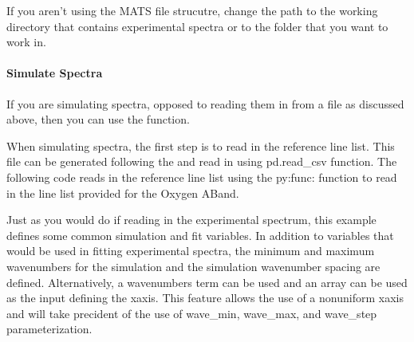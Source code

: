 \documentclass[letterpaper,10pt,english]{sphinxmanual}
\begin{document}
\sphinxAtStartPar
If you aren’t using the MATS file strucutre, change the path to the working directory that contains experimental spectra or to the folder that you want to work in.

\begin{sphinxVerbatim}[commandchars=\\\{\}]
\end{sphinxVerbatim}


\paragraph{Simulate Spectra}
\label{\detokenize{Fitting Synthetic Spectra:simulate-spectra}}
\sphinxAtStartPar
If you are simulating spectra, opposed to reading them in from a file as discussed above, then you can use the {\hyperref[\detokenize{MATS:MATS.spectrum.simulate_spectrum}]{}} function.

\sphinxAtStartPar
When simulating spectra, the first step is to read in the reference line list.  This file can be generated following the {\hyperref[\detokenize{Generating Parameter Line lists:generating-parameter-line-lists}]{}} and read in using pd.read\_csv function. The following code reads in the reference line list using the py:func: function to read in the line list provided for the Oxygen A\sphinxhyphen{}Band.

\begin{sphinxVerbatim}[commandchars=\\\{\}]
   
  \PYG{p}{[}\PYG{p}{]}
\end{sphinxVerbatim}

\sphinxAtStartPar
Just as you would do if reading in the experimental spectrum, this example defines some common simulation and fit variables.  In addition to variables that would be used in fitting experimental spectra, the minimum and maximum wavenumbers for the simulation and the simulation wavenumber spacing are defined.  Alternatively, a wavenumbers term can be used and an array can be used as the input defining the x\sphinxhyphen{}axis.  This feature allows the use of a non\sphinxhyphen{}uniform x\sphinxhyphen{}axis and will take precident of the use of wave\_min, wave\_max, and wave\_step parameterization.
\end{document}
